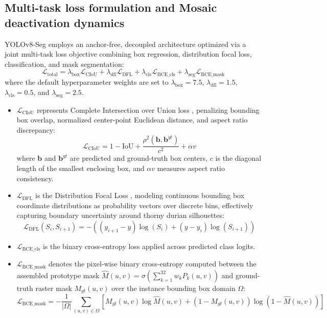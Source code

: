 \documentclass[12pt,a4paper]{article}
\begin{document}
\subsection{Multi-task loss formulation and Mosaic deactivation dynamics}
YOLOv8-Seg employs an anchor-free, decoupled architecture optimized via a joint multi-task loss objective combining box regression, distribution focal loss, classification, and mask segmentation:
\begin{equation}
\mathcal{L}_{\text{total}} = \lambda_{\text{box}} \mathcal{L}_{\text{CIoU}} + \lambda_{\text{dfl}} \mathcal{L}_{\text{DFL}} + \lambda_{\text{cls}} \mathcal{L}_{\text{BCE\_cls}} + \lambda_{\text{seg}} \mathcal{L}_{\text{BCE\_mask}}
\label{eq:total_loss}
\end{equation}
where the default hyperparameter weights are set to $\lambda_{\text{box}} = 7.5$, $\lambda_{\text{dfl}} = 1.5$, $\lambda_{\text{cls}} = 0.5$, and $\lambda_{\text{seg}} = 2.5$.
\begin{itemize}
    \item $\mathcal{L}_{\text{CIoU}}$ represents Complete Intersection over Union loss \cite{zheng2020ciou}, penalizing bounding box overlap, normalized center-point Euclidean distance, and aspect ratio discrepancy:
    \begin{equation}
    \mathcal{L}_{\text{CIoU}} = 1 - \text{IoU} + \frac{\rho^2(\mathbf{b}, \mathbf{b}^{gt})}{c^2} + \alpha v
    \end{equation}
    where $\mathbf{b}$ and $\mathbf{b}^{gt}$ are predicted and ground-truth box centers, $c$ is the diagonal length of the smallest enclosing box, and $\alpha v$ measures aspect ratio consistency.
    
    \item $\mathcal{L}_{\text{DFL}}$ is the Distribution Focal Loss \cite{li2020generalized}, modeling continuous bounding box coordinate distributions as probability vectors over discrete bins, effectively capturing boundary uncertainty around thorny durian silhouettes:
    \begin{equation}
    \mathcal{L}_{\text{DFL}}(S_i, S_{i+1}) = - \left( (y_{i+1} - y) \log(S_i) + (y - y_i) \log(S_{i+1}) \right)
    \end{equation}
    
    \item $\mathcal{L}_{\text{BCE\_cls}}$ is the binary cross-entropy loss applied across predicted class logits.
    
    \item $\mathcal{L}_{\text{BCE\_mask}}$ denotes the pixel-wise binary cross-entropy computed between the assembled prototype mask $\hat{M}(u, v) = \sigma\left(\sum_{k=1}^{32} w_k P_k(u, v)\right)$ and ground-truth raster mask $M_{gt}(u, v)$ over the instance bounding box domain $\Omega$:
    \begin{equation}
    \mathcal{L}_{\text{BCE\_mask}} = -\frac{1}{|\Omega|} \sum_{(u,v) \in \Omega} \left[ M_{gt}(u,v) \log \hat{M}(u,v) + (1 - M_{gt}(u,v)) \log (1 - \hat{M}(u,v)) \right]
    \end{equation}
\end{itemize}
\end{document}
